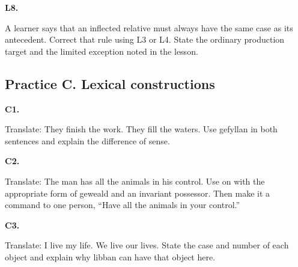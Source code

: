 \par\begin{minipage}{\linewidth}\raggedright
\textbf{L8.}

A learner says that an inflected relative must always have the same case as its antecedent. Correct that rule using L3 or L4. State the ordinary production target and the limited exception noted in the lesson.

\end{minipage}\par\addvspace{4pt}

\subsection*{Practice C. Lexical constructions}

\par\begin{minipage}{\linewidth}\raggedright
\textbf{C1.}

Translate: They finish the work. They fill the waters. Use gefyllan in both sentences and explain the difference of sense.

\end{minipage}\par\addvspace{4pt}

\par\begin{minipage}{\linewidth}\raggedright
\textbf{C2.}

Translate: The man has all the animals in his control. Use on with the appropriate form of geweald and an invariant possessor. Then make it a command to one person, “Have all the animals in your control.”

\end{minipage}\par\addvspace{4pt}

\par\begin{minipage}{\linewidth}\raggedright
\textbf{C3.}

Translate: I live my life. We live our lives. State the case and number of each object and explain why libban can have that object here.

\end{minipage}\par\addvspace{4pt}

